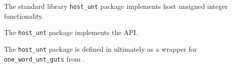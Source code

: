
The standard library {\tt host\_unt} package implements host unsigned integer functionality.

The {\tt host\_unt} package implements the  API.

The {\tt host\_unt} package is defined in  
ultimately as a wrapper for {\tt one\_word\_unt\_guts} from 
.



